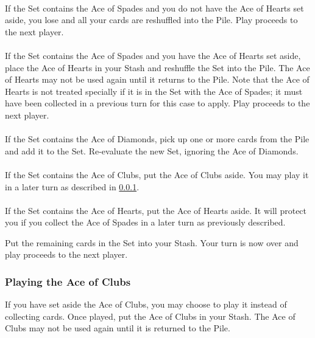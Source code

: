 \documentclass{article}
\begin{document}
\paragraph{}
If the Set contains the Ace of Spades and you do not have the Ace of
Hearts set aside, you lose and all your cards are reshuffled into the
Pile. Play proceeds to the next player.

\paragraph{}
\label{par:spadeshearts}
If the Set contains the Ace of Spades and you have the Ace of Hearts set
aside, place the Ace of Hearts in your Stash and reshuffle the Set into
the Pile. The Ace of Hearts may not be used again until it returns to
the Pile. Note that the Ace of Hearts is not treated specially if it is
in the Set with the Ace of Spades; it must have been collected in a
previous turn for this case to apply. Play proceeds to the next player.

\paragraph{}
If the Set contains the Ace of Diamonds, pick up one or more cards from
the Pile and add it to the Set. Re-evaluate the new Set, ignoring the
Ace of Diamonds.

\paragraph{}
If the Set contains the Ace of Clubs, put the Ace of Clubs aside. You
may play it in a later turn as described in \ref{sec:playac}.

\paragraph{}
If the Set contains the Ace of Hearts, put the Ace of Hearts aside. It
will protect you if you collect the Ace of Spades in a later turn as
previously described.

Put the remaining cards in the Set into your Stash. Your turn is now
over and play proceeds to the next player.

\subsubsection{Playing the Ace of Clubs}
\label{sec:playac}

If you have set aside the Ace of Clubs, you may choose to play it
instead of collecting cards. Once played, put the Ace of Clubs in your
Stash. The Ace of Clubs may not be used again until it is returned to
the Pile.
\end{document}
